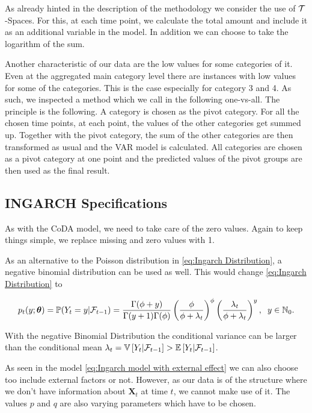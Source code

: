 As already hinted in the description of the methodology we consider the use of $\mathcal{T}$-Spaces. For this, at each time point, we calculate the total amount and include it as an additional variable in the model. In addition we can choose to take the logarithm of the sum. 

Another characteristic of our data are the low values for some categories of it. Even at the aggregated main category level there are instances with low values for some of the categories. This is the case especially for category 3 and 4. As such, we inspected a method which we call in the following one-vs-all. The principle is the following. A category is chosen as the pivot category. For all the chosen time points, at each point, the values of the other categories get summed up. Together with the pivot category, the sum of the other categories are then transformed as usual and the VAR model is calculated. All categories are chosen as a pivot category at one point and the predicted values of the pivot groups are then used as the final result. 


\subsection{INGARCH Specifications}
\label{sec: Ingarch Specifications}

As with the CoDA model, we need to take care of the zero values. Again to keep things simple, we replace missing and zero values with 1. 

As an alternative to the Poisson distribution in \ref{eq:Ingarch Distribution}, a negative binomial distribution can be used as well. This would change \ref{eq:Ingarch Distribution} to 

\begin{equation*}
p_t(y;\bm{\theta})=\mathbb{P}(Y_t=y | \mathcal{F}_{t-1}) = \frac{\Gamma(\phi+y)}{\Gamma(y+1)\Gamma(\phi)}\left(\frac{\phi}{\phi+\lambda_t}\right)^\phi\left(\frac{\lambda_t}{\phi+\lambda_t}\right)^y, \hspace{0.2cm} y \in \mathbb{N}_0.
\label{eq:Ingarch negbinom Distribution}
\end{equation*}

With the negative Binomial Distribution the conditional variance can be larger than the conditional mean $\lambda_t = \mathbb{V}\left[Y_t | \mathcal{F}_{t-1}\right] > \mathbb{E}\left[Y_t | \mathcal{F}_{t-1}\right]$.

As seen in the model \ref{eq:Ingarch model with external effect} we can also choose too include external factors or not. However, as our data is of the structure where we don't have information about $\bm{X}_t$ at time $t$, we cannot make use of it. The values $p$ and $q$ are also varying parameters which have to be chosen. 


